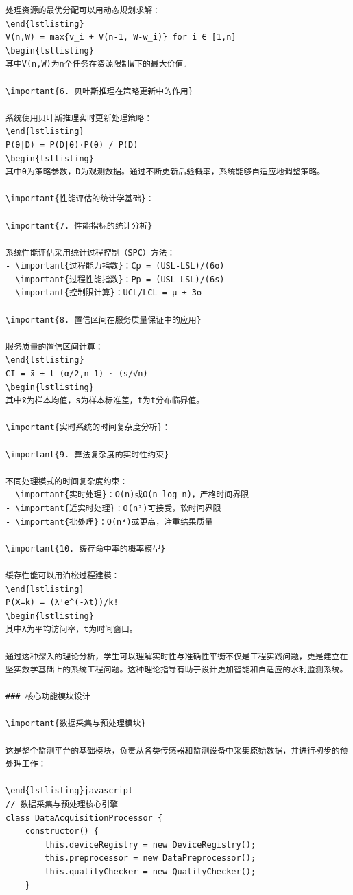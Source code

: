\begin{verbatim}
处理资源的最优分配可以用动态规划求解：
\end{lstlisting}
V(n,W) = max{v_i + V(n-1, W-w_i)} for i ∈ [1,n]
\begin{lstlisting}
其中V(n,W)为n个任务在资源限制W下的最大价值。

\important{6. 贝叶斯推理在策略更新中的作用}

系统使用贝叶斯推理实时更新处理策略：
\end{lstlisting}
P(θ|D) = P(D|θ)·P(θ) / P(D)
\begin{lstlisting}
其中θ为策略参数，D为观测数据。通过不断更新后验概率，系统能够自适应地调整策略。

\important{性能评估的统计学基础}：

\important{7. 性能指标的统计分析}

系统性能评估采用统计过程控制（SPC）方法：
- \important{过程能力指数}：Cp = (USL-LSL)/(6σ)
- \important{过程性能指数}：Pp = (USL-LSL)/(6s)
- \important{控制限计算}：UCL/LCL = μ ± 3σ

\important{8. 置信区间在服务质量保证中的应用}

服务质量的置信区间计算：
\end{lstlisting}
CI = x̄ ± t_(α/2,n-1) · (s/√n)
\begin{lstlisting}
其中x̄为样本均值，s为样本标准差，t为t分布临界值。

\important{实时系统的时间复杂度分析}：

\important{9. 算法复杂度的实时性约束}

不同处理模式的时间复杂度约束：
- \important{实时处理}：O(n)或O(n log n)，严格时间界限
- \important{近实时处理}：O(n²)可接受，软时间界限
- \important{批处理}：O(n³)或更高，注重结果质量

\important{10. 缓存命中率的概率模型}

缓存性能可以用泊松过程建模：
\end{lstlisting}
P(X=k) = (λᵗe^(-λt))/k!
\begin{lstlisting}
其中λ为平均访问率，t为时间窗口。

通过这种深入的理论分析，学生可以理解实时性与准确性平衡不仅是工程实践问题，更是建立在坚实数学基础上的系统工程问题。这种理论指导有助于设计更加智能和自适应的水利监测系统。

### 核心功能模块设计

\important{数据采集与预处理模块}

这是整个监测平台的基础模块，负责从各类传感器和监测设备中采集原始数据，并进行初步的预处理工作：

\end{lstlisting}javascript
// 数据采集与预处理核心引擎
class DataAcquisitionProcessor {
    constructor() {
        this.deviceRegistry = new DeviceRegistry();
        this.preprocessor = new DataPreprocessor();
        this.qualityChecker = new QualityChecker();
    }
    

\end{verbatim}
